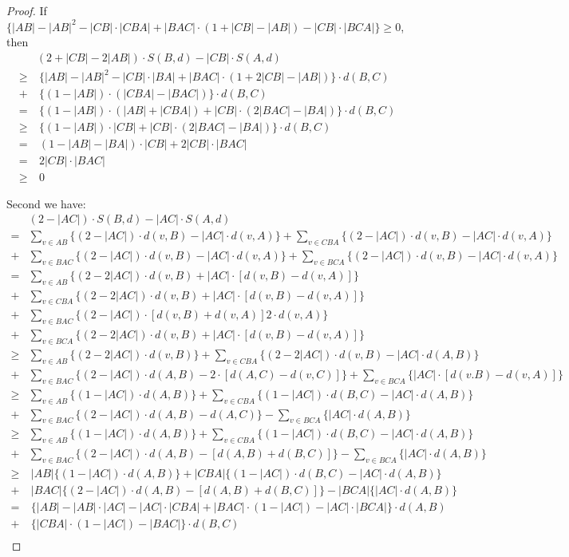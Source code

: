\documentclass[11pt]{article}
\theoremstyle{remark}
\begin{document}
\begin{proof}
If $\{|AB|-|AB|^2 -|CB|\cdot |CBA| + |BAC|\cdot (1+|CB|-|AB|)-|CB|\cdot |BCA|\}\ge 0$, then
 \begin{align*}
 & (2+|CB|-2|AB|)\cdot S(B,d)-|CB|\cdot S(A,d) \\
 \ge &\ \{|AB|-|AB|^2 -|CB|\cdot |BA| + |BAC|\cdot (1+2|CB|-|AB|)\}\cdot d(B,C) \\
 + &\ \{(1-|AB|)\cdot (|CBA|-|BAC|)\}\cdot d(B,C) \\
 = &\ \{(1-|AB|)\cdot (|AB|+|CBA|)+|CB|\cdot (2|BAC|-|BA|)\}\cdot d(B,C) \\
 \ge &\ \{(1-|AB|)\cdot |CB|+|CB|\cdot (2|BAC|-|BA|)\}\cdot d(B,C) \\
 = &\ (1-|AB|-|BA|)\cdot |CB| + 2 |CB|\cdot |BAC| \\
 = &\ 2|CB|\cdot |BAC|\\
 \ge &\ 0
\end{align*}

Second we have:
 \begin{align*}
 & (2-|AC|)\cdot S(B,d) - |AC|\cdot S(A,d) \\
 = & \sum_{v\in AB}\{(2-|AC|)\cdot d(v,B) - |AC|\cdot d(v,A)\} + \sum_{v\in CBA}\{(2-|AC|)\cdot d(v,B) - |AC|\cdot d(v,A)\} \\
 + & \sum_{v\in BAC}\{(2-|AC|)\cdot d(v,B) - |AC|\cdot d(v,A)\} + \sum_{v\in BCA}\{(2-|AC|)\cdot d(v,B) - |AC|\cdot d(v,A)\} \\
 = & \sum_{v\in AB}\{(2-2|AC|)\cdot d(v,B) + |AC|\cdot [d(v,B)-d(v,A)]\}\\
 + & \sum_{v\in CBA}\{(2-2|AC|)\cdot d(v,B) + |AC|\cdot [d(v,B)-d(v,A)]\} \\
 + & \sum_{v\in BAC}\{(2-|AC|)\cdot [d(v,B)+d(v,A)]  2\cdot d(v,A)\}\\
 + & \sum_{v\in BCA}\{(2-2|AC|)\cdot d(v,B) + |AC|\cdot [d(v,B)-d(v,A)]\}\\
 \ge & \sum_{v\in AB}\{(2-2|AC|)\cdot d(v,B)\} + \sum_{v\in CBA}\{(2-2|AC|)\cdot d(v,B) - |AC|\cdot d(A,B)\} \\
 + & \sum_{v\in BAC}\{(2-|AC|)\cdot d(A,B) -2\cdot [d(A,C)-d(v,C)]\} + \sum_{v\in BCA}\{|AC|\cdot [d(v.B)-d(v,A)]\} \\
 \ge & \sum_{v\in AB}\{(1-|AC|)\cdot d(A,B)\} + \sum_{v\in CBA}\{(1-|AC|)\cdot d(B,C) - |AC|\cdot d(A,B)\}\\
 + & \sum_{v\in BAC}\{(2-|AC|)\cdot d(A,B) -d(A,C)\} - \sum_{v\in BCA}\{|AC|\cdot d(A,B)\} \\
 \ge & \sum_{v\in AB}\{(1-|AC|)\cdot d(A,B)\} + \sum_{v\in CBA}\{(1-|AC|)\cdot d(B,C) - |AC|\cdot d(A,B)\} \\
 + & \sum_{v\in BAC}\{(2-|AC|)\cdot d(A,B) -[d(A,B)+d(B,C)]\} - \sum_{v\in BCA}\{|AC|\cdot d(A,B)\} \\
 \ge &\ |AB|\{(1-|AC|)\cdot d(A,B)\} + |CBA|\{(1-|AC|)\cdot d(B,C) - |AC|\cdot d(A,B)\} \\
 + &\ |BAC|\{(2-|AC|)\cdot d(A,B) -[d(A,B)+d(B,C)]\} - |BCA|\{|AC|\cdot d(A,B)\} \\
 = &\ \{|AB|-|AB|\cdot |AC|-|AC|\cdot |CBA| + |BAC|\cdot (1-|AC|) - |AC|\cdot |BCA| \}\cdot d(A,B) \\
 + &\ \{|CBA|\cdot (1-|AC|) - |BAC|\}\cdot d(B,C) \\
\end{align*}


\end{proof}
\end{document}
